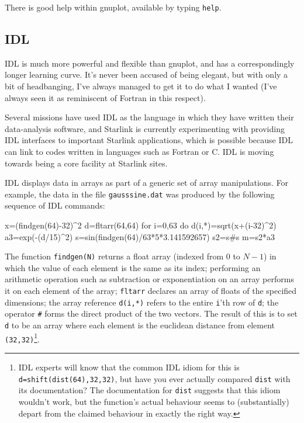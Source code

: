 \documentclass[11pt,oneside,chapters]{starlink}
\begin{document}
There is good help within gnuplot, available by typing
\texttt{help}.

\subsection{IDL}
\label{s:vis-idl}

IDL is much more powerful and flexible than gnuplot, and
has a correspondingly longer learning curve.  It's never
been accused of being elegant, but with only a bit of
headbanging, I've always managed to get it to do what I
wanted (I've always seen it as reminiscent of Fortran in
this respect).

Several missions have used IDL as the language in which
they have written their data-analysis software, and
Starlink is currently experimenting with providing IDL
interfaces to important Starlink applications, which is
possible because IDL can link to codes written in
languages such as Fortran or C.  IDL is moving towards
being a core facility at Starlink sites.

IDL displays data in arrays as part of a generic set of array
manipulations.  For example, the data in the file
\texttt{gausssine.dat} was produced by the following
sequence of IDL commands:

\begin{terminalv}
x=(findgen(64)-32)^2
d=fltarr(64,64)
for i=0,63 do d(i,*)=sqrt(x+(i-32)^2)
a3=exp(-(d/15)^2)
s=sin(findgen(64)/63*5*3.141592657)
s2=s#s
m=s2*a3
\end{terminalv}

The function \texttt{findgen(N)} returns a float array
(indexed from 0 to $N-1$) in
which the value of each element is the same as its index;
performing an arithmetic operation such as subtraction or
exponentiation on an array performs it on each element of
the array; \texttt{fltarr} declares an array of floats
of the specified dimensions; the array reference
\texttt{d(i,*)} refers to the entire \texttt{i}'th
row of \texttt{d}; the operator \texttt{\#} forms
the direct product of the two vectors.  The result of this
is to set \texttt{d} to be an array where each element
is the euclidean distance from element
\texttt{(32,32)}\footnote{IDL experts will know that
the common IDL idiom for this is
\texttt{d=shift(dist(64),32,32)}, but have you ever
actually compared \texttt{dist} with its
documentation?  The documentation for \texttt{dist}
suggests that this idiom wouldn't work, but the function's
actual behaviour seems to (substantially) depart from the
claimed behaviour in exactly the right way.}.
\end{document}
